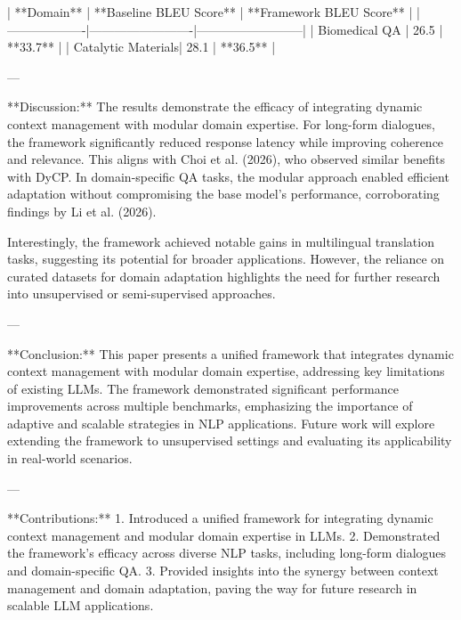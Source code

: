 | **Domain**        | **Baseline BLEU Score** | **Framework BLEU Score** |  
|-------------------|-------------------------|--------------------------|  
| Biomedical QA     | 26.5                   | **33.7**                 |  
| Catalytic Materials| 28.1                   | **36.5**                 |  

---

**Discussion:**  
The results demonstrate the efficacy of integrating dynamic context management with modular domain expertise. For long-form dialogues, the framework significantly reduced response latency while improving coherence and relevance. This aligns with Choi et al. (2026), who observed similar benefits with DyCP. In domain-specific QA tasks, the modular approach enabled efficient adaptation without compromising the base model's performance, corroborating findings by Li et al. (2026).  

Interestingly, the framework achieved notable gains in multilingual translation tasks, suggesting its potential for broader applications. However, the reliance on curated datasets for domain adaptation highlights the need for further research into unsupervised or semi-supervised approaches.  

---

**Conclusion:**  
This paper presents a unified framework that integrates dynamic context management with modular domain expertise, addressing key limitations of existing LLMs. The framework demonstrated significant performance improvements across multiple benchmarks, emphasizing the importance of adaptive and scalable strategies in NLP applications. Future work will explore extending the framework to unsupervised settings and evaluating its applicability in real-world scenarios.  

---

**Contributions:**  
1. Introduced a unified framework for integrating dynamic context management and modular domain expertise in LLMs.  
2. Demonstrated the framework's efficacy across diverse NLP tasks, including long-form dialogues and domain-specific QA.  
3. Provided insights into the synergy between context management and domain adaptation, paving the way for future research in scalable LLM applications.  